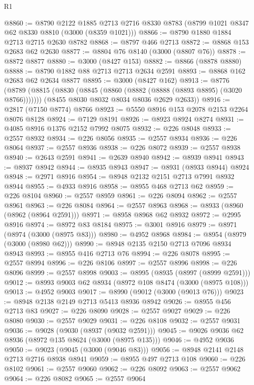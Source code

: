 \begin{lexlean}{R1}
\begin{coremodule}
@8860 := @8790
    @2122
    @1885
    @2713
    @2716
    @8330
    @8783
    (@8799 @1021 @8347 @62 @8330 @8810 (@3000 (@8359 @1021)))
@8866 := @8790 @1880 @1884 @2713 @2715 @2630 @8782
@8868 := @8797 @466 @2713
@8872 := @8868 @153 @2683 @62 @2630
@8877 := @8804 @76 @8140 (@3000 (@8807 @76))
@8878 := @8872 @8877
@8880 := @3000 (@8427 @153)
@8882 := @8866 (@8878 @8880)
@8888 := @8790 @1882 @88 @2713 @2713 @2634 @2591
@8893 := @8868 @162 @2683 @62 @2634 @8877
@8895 := @3000 (@8427 @162)
@8913 := @8776
    (@8789
      (@8815 (@8830 (@8845 (@8860 (@8882 (@8888 (@8893 @8895) (@3020 @8766)))))))
      (@8455 @8030 @8032 @8034 @8036 @2629 @2633))
@8916 := @2817 (@7150 @8774) @8766
@8923 := @5550 @8916 @153 @2078 @2153 @2264 @8076 @8128
@8924 := @7129 @8191
@8926 := @8923 @8924 @8274
@8931 := @4085 @8916 @1376 @2152 @7992 @8075
@8932 := @226 @8048
@8933 := @2557 @8932
@8934 := @226 @8056
@8935 := @2557 @8934
@8936 := @226 @8064
@8937 := @2557 @8936
@8938 := @226 @8072
@8939 := @2557 @8938
@8940 := @2643 @2591
@8941 := @2639 @8940
@8942 := @8939 @8941
@8943 := @8937 @8942
@8944 := @8935 @8943
@8947 := @8931 (@8933 @8944) @8924
@8948 := @2971 @8916
@8954 := @8948 @2132 @2151 @2713 @7991 @8932 @8944
@8955 := @4933 @8916
@8958 := @8955 @468 @2713 @62
@8959 := @226 @8104
@8960 := @2557 @8959
@8961 := @226 @8094
@8962 := @2557 @8961
@8963 := @226 @8084
@8964 := @2557 @8963
@8968 := @8933 (@8960 (@8962 (@8964 @2591)))
@8971 := @8958 @8968 @62 @8932
@8972 := @2995 @8916
@8974 := @8972 @83 @8184
@8975 := @3001 @8916
@8979 := @8971 (@8974 (@3000 (@8975 @83)))
@8980 := @4952 @8968
@8984 := @8954 (@8979 (@3000 (@8980 @62)))
@8990 := @8948 @2135 @2150 @2713 @7096 @8934 @8943
@8993 := @8955 @416 @2713 @76
@8994 := @226 @8078
@8995 := @2557 @8994
@8996 := @226 @8106
@8997 := @2557 @8996
@8998 := @226 @8096
@8999 := @2557 @8998
@9003 := @8995 (@8935 (@8997 (@8999 @2591)))
@9012 := @8993 @9003 @62 @8934 (@8972 @108 @8474 (@3000 (@8975 @108)))
@9013 := @4952 @9003
@9017 := @8990 (@9012 (@3000 (@9013 @76)))
@9023 := @8948 @2138 @2149 @2713 @5413 @8936 @8942
@9026 := @8955 @456 @2713 @83
@9027 := @226 @8090
@9028 := @2557 @9027
@9029 := @226 @8080
@9030 := @2557 @9029
@9031 := @226 @8108
@9032 := @2557 @9031
@9036 := @9028 (@9030 (@8937 (@9032 @2591)))
@9045 := @9026 @9036 @62 @8936 (@8972 @135 @8624 (@3000 (@8975 @135)))
@9046 := @4952 @9036
@9050 := @9023 (@9045 (@3000 (@9046 @83)))
@9056 := @8948 @2141 @2148 @2713 @2716 @8938 @8941
@9059 := @8955 @497 @2713 @108
@9060 := @226 @8102
@9061 := @2557 @9060
@9062 := @226 @8092
@9063 := @2557 @9062
@9064 := @226 @8082
@9065 := @2557 @9064

\end{coremodule}
\end{lexlean}
